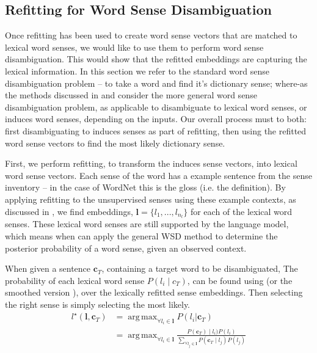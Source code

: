 \documentclass{sig-alternate}
\renewcommand{\c}{\mathbf{c}}
\renewcommand{\l}{\mathbf{l}}
\DeclareMathOperator*{\argmax}{arg\,max}
\begin{document}
\subsection{Refitting for Word Sense Disambiguation} \label{lexicalWSD}
Once refitting has been used to create word sense vectors that are matched to lexical word senses, we would like to use them to perform word sense disambiguation. This would show that the refitted embeddings are capturing the lexical information. In this section we refer to the standard word sense disambiguation problem -- to take a word and find it's dictionary sense; where-as the methods discussed in  and  consider the more general word sense disambiguation problem, as applicable to disambiguate to lexical word senses, or induces word senses, depending on the inputs. Our overall process must to both: first disambiguating to induces senses as part of refitting, then using the refitted word sense vectors to find the most likely dictionary sense.

First, we perform refitting, to transform the induces sense vectors, into lexical word sense vectors. Each sense of the word has a example sentence from the sense inventory -- in the case of WordNet this is the gloss (i.e. the definition). By applying refitting to the unsupervised senses using these example contexts, as discussed in , we find embeddings, $\l=\{l_1,..., l_{n_l}\}$ for each of the lexical word senses. These lexical word senses are still supported by the language model, which means when can apply the general WSD method to determine the posterior probability of a word sense, given an observed context. 

When given a sentence $\c_{T}$, containing a target word to be disambiguated, 
The probability of each lexical word sense $P(l_i \mid c_{T})$, can be found using  (or the smoothed version ), over the lexically refitted sense embeddings. Then selecting the right sense is simply selecting the most likely. 
\begin{equation}
\begin{aligned}\label{eq:lexicalwsd}
l^\star (\l, \c_T) &= \argmax_{\forall l_i \in \l} P(l_i|\c_T) \\
&= \argmax_{\forall l_i \in \l} \frac{P(\c_T) \mid l_i)P(l_i)}{\sum_{\forall l_j \in \l} P(\c_T \mid l_j)P(l_j)}
\end{aligned}
\end{equation}
\end{document}
